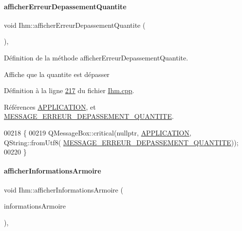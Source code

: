 \paragraph{\texorpdfstring{afficher\+Erreur\+Depassement\+Quantite}{afficherErreurDepassementQuantite}}
{\footnotesize\ttfamily void Ihm\+::afficher\+Erreur\+Depassement\+Quantite (\begin{DoxyParamCaption}{ }\end{DoxyParamCaption})\hspace{0.3cm}{\ttfamily [private]}, {\ttfamily [slot]}}



Définition de la méthode afficher\+Erreur\+Depassement\+Quantite. 

Affiche que la quantite est dépasser 

Définition à la ligne \hyperlink{_ihm_8cpp_source_l00217}{217} du fichier \hyperlink{_ihm_8cpp_source}{Ihm.\+cpp}.



Références \hyperlink{_ihm_8h_source_l00031}{A\+P\+P\+L\+I\+C\+A\+T\+I\+ON}, et \hyperlink{_ihm_8h_source_l00034}{M\+E\+S\+S\+A\+G\+E\+\_\+\+E\+R\+R\+E\+U\+R\+\_\+\+D\+E\+P\+A\+S\+S\+E\+M\+E\+N\+T\+\_\+\+Q\+U\+A\+N\+T\+I\+TE}.


\begin{DoxyCode}
00218 \{
00219     QMessageBox::critical(\textcolor{keyword}{nullptr}, \hyperlink{_ihm_8h_a796bd7c6ba2e59281760fb155c6287e8}{APPLICATION}, QString::fromUtf8(
      \hyperlink{_ihm_8h_a6f69dbaa1a7d36f46cb64b31933b0251}{MESSAGE\_ERREUR\_DEPASSEMENT\_QUANTITE}));
00220 \}
\end{DoxyCode}
\mbox{\label{class_ihm_a9baabf33ec07777144921013c354884e}} 
\paragraph{\texorpdfstring{afficher\+Informations\+Armoire}{afficherInformationsArmoire}}
{\footnotesize\ttfamily void Ihm\+::afficher\+Informations\+Armoire (\begin{DoxyParamCaption}\item[{Q\+String\+List}]{informations\+Armoire }\end{DoxyParamCaption})\hspace{0.3cm}{\ttfamily [private]}, {\ttfamily [slot]}}




